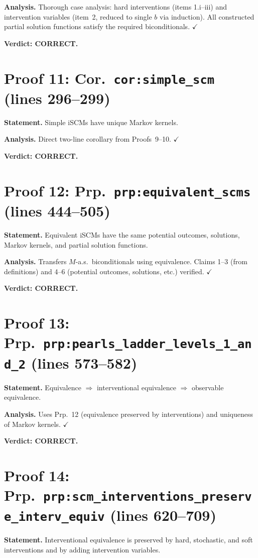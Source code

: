 \documentclass{article}
\begin{document}
\textbf{Analysis.} Thorough case analysis: hard interventions (items 1.i--iii)
and intervention variables (item~2, reduced to single $b$ via induction).
All constructed partial solution functions satisfy the required biconditionals.
$\checkmark$

\textbf{Verdict: CORRECT.}

\section{Proof 11: Cor.\ \texttt{cor:simple\_scm} (lines 296--299)}
\textbf{Statement.} Simple iSCMs have unique Markov kernels.

\textbf{Analysis.} Direct two-line corollary from Proofs~9--10.  $\checkmark$

\textbf{Verdict: CORRECT.}

\section{Proof 12: Prp.\ \texttt{prp:equivalent\_scms} (lines 444--505)}
\textbf{Statement.} Equivalent iSCMs have the same potential outcomes, solutions,
Markov kernels, and partial solution functions.

\textbf{Analysis.} Transfers $M$-a.s.\ biconditionals using equivalence.
Claims 1--3 (from definitions) and 4--6 (potential outcomes, solutions, etc.)
verified.  $\checkmark$

\textbf{Verdict: CORRECT.}

\section{Proof 13: Prp.\ \texttt{prp:pearls\_ladder\_levels\_1\_and\_2}
(lines 573--582)}
\textbf{Statement.} Equivalence $\Rightarrow$ interventional equivalence
$\Rightarrow$ observable equivalence.

\textbf{Analysis.} Uses Prp.~12 (equivalence preserved by interventions)
and uniqueness of Markov kernels.  $\checkmark$

\textbf{Verdict: CORRECT.}

\section{Proof 14: Prp.\ \texttt{prp:scm\_interventions\_preserve\_interv\_equiv}
(lines 620--709)}
\textbf{Statement.} Interventional equivalence is preserved by hard, stochastic,
and soft interventions and by adding intervention variables.
\end{document}
